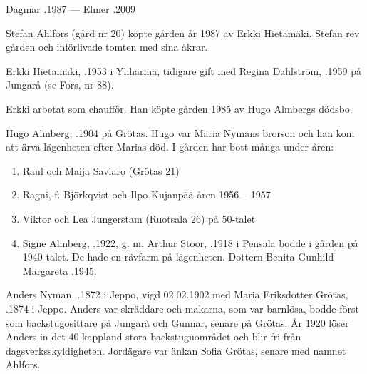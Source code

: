Dagmar .1987  ---  Elmer .2009






Stefan Ahlfors (gård nr 20) köpte gården år 1987 av Erkki Hietamäki. Stefan rev gården och införlivade tomten med sina åkrar.\jhvspace{}


Erkki Hietamäki, .1953 i Ylihärmä, tidigare gift med Regina Dahlström, .1959  på Jungarå (se Fors, nr 88).
\begin{jhchildren}
  \item {}
  \item {}
\end{jhchildren}

Erkki arbetat som chaufför. Han köpte gården 1985 av Hugo Almbergs dödsbo.


Hugo Almberg, .1904 på Grötas. Hugo var Maria Nymans brorson och han kom att ärva lägenheten efter Marias död. I gården har bott många  under åren:
\begin{enumerate}
  \item Raul och Maija Saviaro (Grötas  21)
  \item Ragni, f. Björkqvist och Ilpo Kujanpää åren 1956 – 1957
  \item Viktor och Lea Jungerstam (Ruotsala 26) på 50-talet
  \item Signe Almberg, .1922, g. m. Arthur Stoor, .1918  i Pensala bodde i gården på 1940-talet. De hade en rävfarm på lägenheten. Dottern Benita Gunhild Margareta .1945.
\end{enumerate}


Anders Nyman, .1872 i Jeppo, vigd 02.02.1902 med Maria Eriksdotter Grötas, .1874 i Jeppo. Anders var skräddare och makarna, som var barnlösa, bodde först som backstugosittare på Jungarå och Gunnar, senare på Grötas. År 1920 löser Anders in det 40 kappland stora backstuguområdet och blir fri från dagsverksskyldigheten. Jordägare var änkan Sofia Grötas, senare  med namnet Ahlfors.

